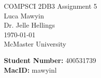 \documentclass[letterpaper]{article}
\theoremstyle{plain}
\theoremstyle{definition}
\theoremstyle{remark}
\begin{document}

\begin{titlepage}
    \centering
    \vspace*{3cm}
    
    {\Huge COMPSCI 2DB3 Assignment 5}\\[2cm]
    
    {\large Luca Mawyin}\\[0.5cm]
    
    {\large Dr. Jelle Hellings}\\[0.5cm]

    {\large \today}\\[2cm]

    {\Large McMaster University}

    \vfill
    \begin{flushleft}

        {\large \textbf{Student Number: }400531739}\\[0.5cm]
        {\large \textbf{MacID: }mawyinl}
    \end{flushleft}

\end{titlepage}
\end{document}
